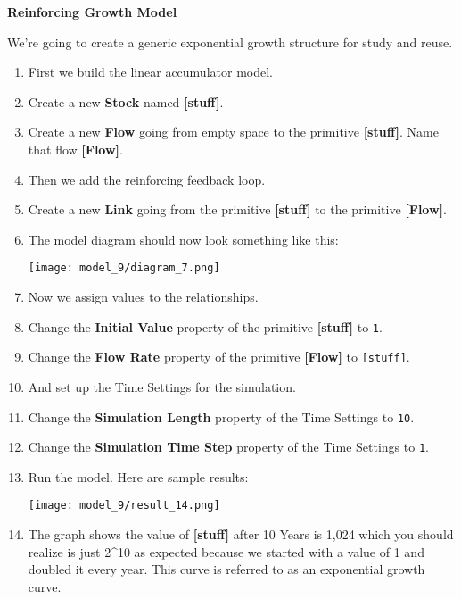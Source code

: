\documentclass[]{memoir}
\makeatletter
\def\maxwidth{\ifdim\Gin@nat@width>\linewidth\linewidth
\else\Gin@nat@width\fi}
\let\Oldincludegraphics\includegraphics
\renewcommand{\includegraphics}[1]{\Oldincludegraphics[width=\maxwidth]{#1}}
\newcommand{\p}[1]{\textbf{{[}#1{]}}}
\newcommand{\e}[1]{\texttt{#1}}
\renewcommand{\a}[1]{\textbf{#1}}
\makeatother
\begin{document}
\begin{oframed}\textbf{Reinforcing Growth Model} 

 We're going to create a generic exponential growth structure for study and reuse.

\begin{enumerate}
\item 

First we build the linear accumulator model.


\item Create a new \a{Stock} named \p{stuff}.
\item Create a new \a{Flow} going from empty space to the primitive \p{stuff}. Name that flow \p{Flow}.
\item 

Then we add the reinforcing feedback loop.


\item Create a new \a{Link} going from the primitive \p{stuff} to the primitive \p{Flow}.
\item The model diagram should now look something like this: \par \begin{minipage}{\linewidth}  \centering \texttt{[image: model\_9/diagram\_7.png]}
\end{minipage}
\item 

Now we assign values to the relationships.


\item  Change the \a{Initial Value} property of the primitive \p{stuff} to \e{1}.
\item  Change the \a{Flow Rate} property of the primitive \p{Flow} to \e{[stuff]}.
\item 

And set up the Time Settings for the simulation.


\item  Change the \a{Simulation Length} property of the Time Settings to \e{10}.
\item  Change the \a{Simulation Time Step} property of the Time Settings to \e{1}.
\item Run the model. Here are sample results:\par \begin{minipage}{\linewidth}  \centering \texttt{[image: model\_9/result\_14.png]}
\end{minipage}
\item 

The graph shows the value of \p{stuff} after 10 Years is 1,024 which you should realize is just 2\^{}10 as expected because we started with a value of 1 and doubled it every year. This curve is referred to as an exponential growth curve.



\end{enumerate} \end{oframed}
\end{document}
